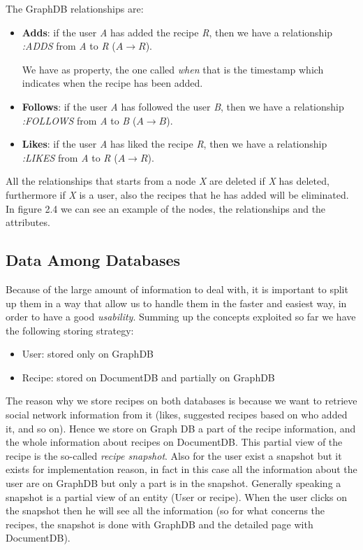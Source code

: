 \documentclass[a4paper]{report}
\begin{document}
\noindent The GraphDB relationships are:
\begin{itemize}
	\item \textbf{Adds}: if the user \emph{A} has added the recipe \emph{R}, then we have a relationship \emph{:ADDS} from \emph{A} to \emph{R} ($A \rightarrow R$).
	
	\noindent We have as property, the one called \emph{when} that is the timestamp which indicates when the recipe has been added.
	
	\item \textbf{Follows}: if the user \emph{A} has followed the user \emph{B}, then we have a relationship \emph{:FOLLOWS} from \emph{A} to \emph{B} ($A \rightarrow B$).
	
	\item \textbf{Likes}: if the user \emph{A} has liked the recipe \emph{R}, then we have a relationship \emph{:LIKES} from \emph{A} to \emph{R} ($A \rightarrow R$).
\end{itemize}  

\noindent All the relationships that starts from a node \emph{X} are deleted if \emph{X} has deleted, furthermore if \emph{X} is a user, also the recipes that he has added will be eliminated. In figure 2.4 we can see an example of the nodes, the relationships and the attributes.


\subsection{Data Among Databases}
Because of the large amount of information to deal with, it is important to split up them in a way that allow us to handle them in the faster and easiest way, in order to have a good \emph{usability}. Summing up the concepts exploited so far we have the following storing strategy:
\begin{itemize}
	\item User: stored only on GraphDB
	\item Recipe: stored on DocumentDB and partially on GraphDB
\end{itemize}

\noindent The reason why we store recipes on both databases is because we want to retrieve social network information from it (likes, suggested recipes based on who added it, and so on). Hence we store on Graph DB a part of the recipe information, and the whole information about recipes on DocumentDB. This partial view of the recipe is the so-called \emph{recipe snapshot}. Also for the user exist a snapshot but it exists for implementation reason, in fact in this case all the information about the user are on GraphDB but only a part is in the snapshot. Generally speaking a snapshot is a partial view of an entity (User or recipe). When the user clicks on the snapshot then he will see all the information (so for what concerns the recipes, the snapshot is done with GraphDB and the detailed page with DocumentDB).
\end{document}
